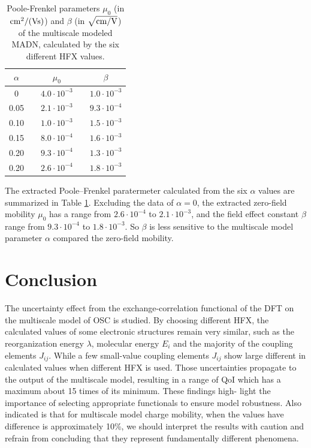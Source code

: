 \documentclass[%
 reprint,
superscriptaddress,
 amsmath,amssymb,
 aps,
prb,
floatfix
]{revtex4-2}
\begin{document}
%
\begin{table}[tbp]%
  \caption{\label{tab:PF_parameter}%
  Poole-Frenkel parameters $\mu_0$ (in $\unit[]{cm^2/(Vs)}$) and $\beta$ (in $\unit[]{\sqrt{cm/V}}$) of the multiscale modeled MADN, calculated by the six different HFX values. 
  }
  \begin{ruledtabular}
    \begin{tabular}{c c c c c}
    $\alpha$ & & $\mu_0$  & & $\beta$ \\
      \hline
    0 & & $4.0 \cdot 10^{-3}$ & & $1.0 \cdot 10^{-3}$ \\
    0.05 & & $2.1 \cdot 10^{-3}$ & & $9.3 \cdot 10^{-4}$ \\
    0.10 & & $1.0 \cdot 10^{-3}$ & & $1.5 \cdot 10^{-3}$ \\
    0.15 & & $8.0 \cdot 10^{-4}$ & & $1.6 \cdot 10^{-3}$ \\
    0.20 & & $9.3 \cdot 10^{-4}$ & & $1.3 \cdot 10^{-3}$ \\
    0.20 & & $2.6 \cdot 10^{-4}$ & & $1.8 \cdot 10^{-3}$ \\
      \end{tabular}
  \end{ruledtabular}
  \end{table}
%  
The extracted Poole–Frenkel paratermeter calculated from the six $\alpha$ values are summarized in Table \ref{tab:PF_parameter}. 
Excluding the data of $\alpha=0$, the extracted zero-field mobility $\mu_0$ has a range from $2.6 \cdot 10^{-4}$ to $2.1 \cdot 10^{-3}$, and the field effect constant $\beta$ range from $9.3 \cdot 10^{-4}$ to $1.8 \cdot 10^{-3}$.
So $\beta$ is less sensitive to the multiscale model parameter $\alpha$ compared the zero-field mobility.
\section{Conclusion}
The uncertainty effect from the exchange-correlation functional of the DFT on the multiscale model of OSC is studied. By choosing different HFX, the calculated values of some electronic structures remain very similar,
such as the reorganization energy $\lambda$, molecular energy $E_i$ and the majority of the coupling elements  $J_{ij}$. While a few small-value coupling elements $J_{ij}$ show large different in calculated values when different HFX is used. Those uncertainties propagate to the output of the multiscale model, resulting in a range of QoI which has a maximum about 15 times of its minimum. These findings high-
light the importance of selecting appropriate functionals to ensure model robustness. Also indicated is that for multiscale model charge mobility, when the values have difference is approximately 10\%, we should interpret the results with caution and refrain from concluding that they represent fundamentally different phenomena.
\end{document}
